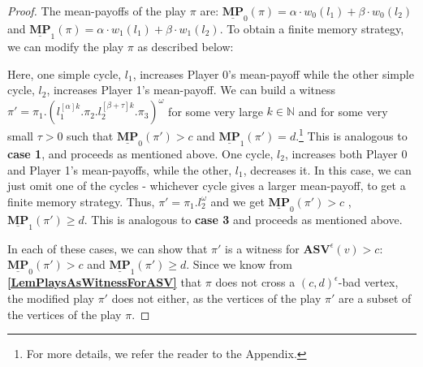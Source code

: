 \begin{proof}
\noindent The mean-payoffs of the play $\pi$ are: $\underline{\mathbf{MP}}_0(\pi) = \alpha \cdot w_0(l_1) + \beta \cdot w_0(l_2)$ and $\underline{\mathbf{MP}}_1(\pi) = \alpha \cdot w_1(l_1) + \beta \cdot w_1(l_2)$. To obtain a finite memory strategy, we can modify the play $\pi$ as described below:
\begin{caseof}
    Here, one simple cycle, $l_1$, increases Player 0's mean-payoff while the other simple cycle, $l_2$, increases Player 1's mean-payoff. We can build a witness $\pi' = \pi_1.(l_1^{[\alpha]k}.\pi_2.l_2^{[\beta+\tau]k}.\pi_3)^{\omega}$ for some very large $k \in \mathbb{N}$ and for some very small $\tau > 0$ such that $\underline{\mathbf{MP}}_0(\pi') > c$ and $\underline{\mathbf{MP}}_1(\pi') = d$.\footnote{For more details, we refer the reader to the Appendix.}
    This is analogous to \textbf{case 1}, and proceeds as mentioned above.
    One cycle, $l_2$, increases both Player 0 and Player 1's mean-payoffs, while the other, $l_1$, decreases it. In this case, we can just omit one of the cycles - whichever cycle gives a larger mean-payoff, to get a finite memory strategy. Thus, $\pi' = \pi_1.l_2^{\omega}$ and we get $\underline{\mathbf{MP}}_0(\pi') > c$ , $\underline{\mathbf{MP}}_1(\pi') \geqslant d$.
    This is analogous to \textbf{case 3} and proceeds as mentioned above.
\end{caseof}
In each of these cases, we can show that $\pi'$ is a witness for $\mathbf{ASV}^{\epsilon}(v) > c$: $\underline{\mathbf{MP}}_0(\pi') > c$ and $\underline{\mathbf{MP}}_1(\pi') \geqslant d$.
Since we know from \textbf{\cref{LemPlaysAsWitnessForASV}} that $\pi$ does not cross a $(c,d)^{\epsilon}$-bad vertex, the modified play $\pi'$ does not either, as the vertices of the play $\pi'$ are a subset of the vertices of the play $\pi$. 


\end{proof}
